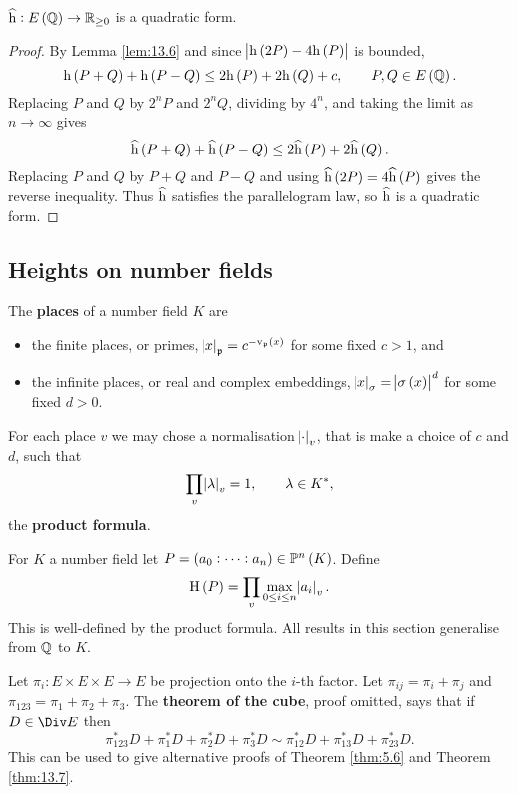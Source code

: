 \begin{theorem}
\label{thm:13.7}
$ \widehat{\h} : E\br{\QQ} \to \RR_{\ge 0} $ is a quadratic form.
\end{theorem}

\begin{proof}
By Lemma \ref{lem:13.6} and since $ \abs{\h\br{2P} - 4\h\br{P}} $ is bounded,
$$ \h\br{P + Q} + \h\br{P - Q} \le 2\h\br{P} + 2\h\br{Q} + c, \qquad P, Q \in E\br{\QQ}. $$
Replacing $ P $ and $ Q $ by $ 2^nP $ and $ 2^nQ $, dividing by $ 4^n $, and taking the limit as $ n \to \infty $ gives
$$ \widehat{\h}\br{P + Q} + \widehat{\h}\br{P - Q} \le 2\widehat{\h}\br{P} + 2\widehat{\h}\br{Q}. $$
Replacing $ P $ and $ Q $ by $ P + Q $ and $ P - Q $ and using $ \widehat{\h}\br{2P} = 4\widehat{\h}\br{P} $ gives the reverse inequality. Thus $ \widehat{\mathrm{h}} $ satisfies the parallelogram law, so $ \widehat{\mathrm{h}} $ is a quadratic form.
\end{proof}

\pagebreak

\subsection{Heights on number fields}

The \textbf{places} of a number field $ K $ are
\begin{itemize}
\item the finite places, or primes, $ \abs{x}_\ppp = c^{-\v_\ppp\br{x}} $ for some fixed $ c > 1 $, and
\item the infinite places, or real and complex embeddings, $ \abs{x}_\sigma = \abs{\sigma\br{x}}^d $ for some fixed $ d > 0 $.
\end{itemize}
For each place $ v $ we may chose a normalisation $ \abs{\cdot}_v $, that is make a choice of $ c $ and $ d $, such that
$$ \prod_v \abs{\lambda}_v = 1, \qquad \lambda \in K^*, $$
the \textbf{product formula}.

\begin{remark*}
For $ K $ a number field let $ P = \br{a_0 : \dots : a_n} \in \PP^n\br{K} $. Define
$$ \H\br{P} = \prod_v \max_{0 \le i \le n} \abs{a_i}_v. $$
This is well-defined by the product formula. All results in this section generalise from $ \mathbb{Q} $ to $ K $.
\end{remark*}

\begin{remark*}
Let $ \pi_i : E \times E \times E \to E $ be projection onto the $ i $-th factor. Let $ \pi_{ij} = \pi_i + \pi_j $ and $ \pi_{123} = \pi_1 + \pi_2 + \pi_3 $. The \textbf{theorem of the cube}, proof omitted, says that if $ D \in \Div E $ then
$$ \pi_{123}^*D + \pi_1^*D + \pi_2^*D + \pi_3^*D \sim \pi_{12}^*D + \pi_{13}^*D + \pi_{23}^*D. $$
This can be used to give alternative proofs of Theorem \ref{thm:5.6} and Theorem \ref{thm:13.7}.
\end{remark*}

